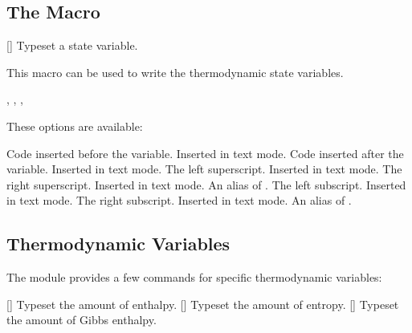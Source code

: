 \documentclass{chemmacros-manual}
\begin{document}
\subsection{The  Macro}

\begin{commands}
  []
    Typeset a state variable.
\end{commands}

This macro can be used to write the thermodynamic state variables.
\begin{example}
  ,  ,
  ,
\end{example}

These options are available:
\begin{options}
    Code inserted before the variable.  Inserted in text mode.
  \Default
    Code inserted after the variable. Inserted in text mode.
  \Default
    The left superscript. Inserted in text mode.
    The right superscript. Inserted in text mode.
    An alias of .
  \Default
    The left subscript. Inserted in text mode.
  \Default
    The right subscript. Inserted in text mode.
    An alias of .
\end{options}

\subsection{Thermodynamic Variables}

The  module provides a few commands for specific
thermodynamic variables:
\begin{commands}
  [\sarg{}]
    Typeset the amount of enthalpy.
  [\sarg{}]
    Typeset the amount of entropy.
  [\sarg{}]
    Typeset the amount of Gibbs enthalpy.
\end{commands}
\end{document}
